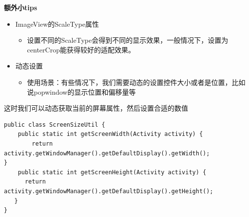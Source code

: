 \documentclass[9pt, b5paper]{article}
\begin{document}
\begin{enumerate}
\textbf{额外小tips}
\begin{itemize}
\item ImageView的ScaleType属性
\begin{itemize}
\item 设置不同的ScaleType会得到不同的显示效果，一般情况下，设置为centerCrop能获得较好的适配效果。
\end{itemize}
\item 动态设置
\begin{itemize}
\item 使用场景：有些情况下，我们需要动态的设置控件大小或者是位置，比如说popwindow的显示位置和偏移量等
\end{itemize}
\end{itemize}

这时我们可以动态获取当前的屏幕属性，然后设置合适的数值
\begin{verbatim}
public class ScreenSizeUtil { 
    public static int getScreenWidth(Activity activity) { 
        return activity.getWindowManager().getDefaultDisplay().getWidth(); 
} 
    public static int getScreenHeight(Activity activity) { 
      return activity.getWindowManager().getDefaultDisplay().getHeight(); 
   }
}
\end{verbatim}
\end{enumerate}
\end{document}
